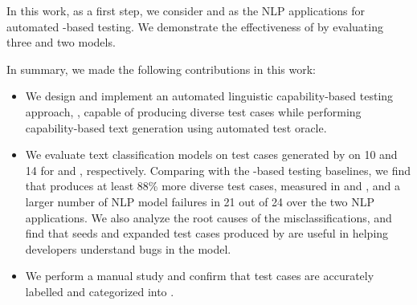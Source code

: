 In this work, as a first step, we consider \sa and \hsd as the NLP applications for automated \lc-based testing.
We demonstrate the effectiveness of \tool by evaluating three \sa and two \hsd models.



\vspace{2pt}
\noindent
In summary, we made the following contributions in this work:

\begin{itemize}[topsep=3pt,itemsep=3pt,partopsep=0ex,parsep=0ex,leftmargin=*]
%
\item We design and implement an 
automated linguistic capability-based testing approach, \tool, capable of producing diverse test cases while performing capability-based text generation using automated test oracle.
%
\item We evaluate text classification models on test cases generated by \tool on 10 and 14 \lcs for \sa and \hsd, respectively. Comparing with the \sota \lc-based testing baselines, we find that \tool produces at least 88\% more diverse test cases, measured in \selfbleu and \pdr, and a larger number of NLP model failures in 21 out of 24 \lcs over the two NLP applications.
We also analyze the root causes of the misclassifications, and find that seeds and expanded test cases produced by \tool are useful in helping developers understand bugs in the model. 
%
\item We perform a manual study and confirm that \tool test cases are accurately labelled  and categorized into \lcs. 
\end{itemize}